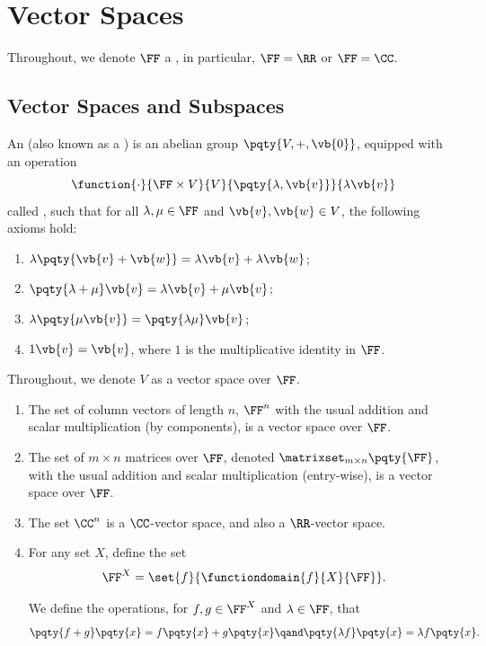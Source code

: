 \section{Vector Spaces}

Throughout, we denote \(\FF\) a , in particular, \(\FF = \RR\) or \(\FF = \CC\).

\subsection{Vector Spaces and Subspaces}

\begin{definition}
    An  (also known as a ) is an abelian group \(\pqty{V, +, \vb{0}}\), equipped with an operation
    \[
        \function{\cdot}{\FF \times V}{V}{\pqty{\lambda, \vb{v}}}{\lambda \vb{v}}
    \]
    called , such that for all \(\lambda, \mu \in \FF\) and \(\vb{v}, \vb{w} \in V\), the following axioms hold:
    \begin{enumerate}[label=(\roman*)]
        \item \(\lambda \pqty{\vb{v} + \vb{w}} = \lambda \vb{v} + \lambda \vb{w}\);
        \item \(\pqty{\lambda + \mu} \vb{v} = \lambda \vb{v} + \mu \vb{v}\);
        \item \(\lambda \pqty{\mu \vb{v}} = \pqty{\lambda \mu} \vb{v}\);
        \item \(1 \vb{v} = \vb{v}\), where \(1\) is the multiplicative identity in \(\FF\).
    \end{enumerate}
\end{definition}

\begin{notation}
    Throughout, we denote \(V\) as a vector space over \(\FF\).
\end{notation}

\begin{examples}
    \begin{enumerate}
        \item The set of column vectors of length \(n\), \(\FF^n\) with the usual addition and scalar multiplication (by components), is a vector space over \(\FF\).
        \item The set of \(m \times n\) matrices over \(\FF\), denoted \(\matrixset_{m \times n} \pqty{\FF}\), with the usual addition and scalar multiplication (entry-wise), is a vector space over \(\FF\).
        \item The set \(\CC^n\) is a \(\CC\)-vector space, and also a \(\RR\)-vector space.
        \item For any set \(X\), define the set
        \[
            \FF^X = \set{f}{\functiondomain{f}{X}{\FF}}.
        \]

        We define the operations, for \(f, g \in \FF^X\) and \(\lambda \in \FF\), that
        \[
            \pqty{f + g} \pqty{x} = f \pqty{x} + g \pqty{x} \qand \pqty{\lambda f} \pqty{x} = \lambda f \pqty{x}.
        \]
    \end{enumerate}
\end{examples}

